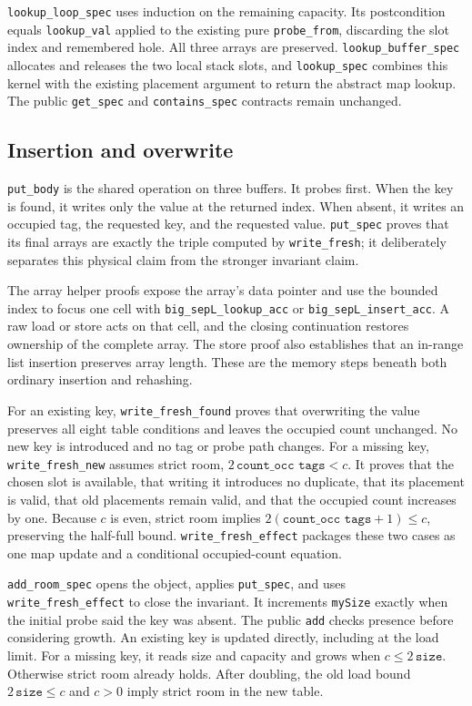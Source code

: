 \documentclass[11pt]{article}
\begin{document}
\texttt{lookup\_loop\_spec} uses induction on the remaining capacity. Its
postcondition equals \texttt{lookup\_val} applied to the existing pure
\texttt{probe\_from}, discarding the slot index and remembered hole. All
three arrays are preserved. \texttt{lookup\_buffer\_spec} allocates and
releases the two local stack slots, and \texttt{lookup\_spec} combines this
kernel with the existing placement argument to return the abstract map
lookup. The public \texttt{get\_spec} and \texttt{contains\_spec} contracts
remain unchanged.

\subsection{Insertion and overwrite}

\texttt{put\_body} is the shared operation on three buffers. It probes first.
When the key is found, it writes only the value at the returned index. When
absent, it writes an occupied tag, the requested key, and the requested value.
\texttt{put\_spec} proves that its final arrays are exactly the triple computed
by \texttt{write\_fresh}; it deliberately separates this physical claim from
the stronger invariant claim.

The array helper proofs expose the array's data pointer and use the bounded
index to focus one cell with \texttt{big\_sepL\_lookup\_acc} or
\texttt{big\_sepL\_insert\_acc}. A raw load or store acts on that cell, and the
closing continuation restores ownership of the complete array. The store proof
also establishes that an in-range list insertion preserves array length.
These are the memory steps beneath both ordinary insertion and rehashing.

For an existing key, \texttt{write\_fresh\_found} proves that overwriting the
value preserves all eight table conditions and leaves the occupied count
unchanged. No new key is introduced and no tag or probe path changes.
For a missing key, \texttt{write\_fresh\_new} assumes strict room,
$2\,\texttt{count\_occ tags}<c$. It proves that the chosen slot is available,
that writing it introduces no duplicate, that its placement is valid, that old
placements remain valid, and that the occupied count increases by one.
Because $c$ is even, strict room implies
$2(\texttt{count\_occ tags}+1)\leq c$, preserving the half-full bound.
\texttt{write\_fresh\_effect} packages these two cases as one map update and a
conditional occupied-count equation.

\texttt{add\_room\_spec} opens the object, applies \texttt{put\_spec}, and uses
\texttt{write\_fresh\_effect} to close the invariant. It increments
\texttt{mySize} exactly when the initial probe said the key was absent.
The public \texttt{add} checks presence before considering growth. An existing
key is updated directly, including at the load limit. For a missing key, it
reads size and capacity and grows when $c\leq 2\,\texttt{size}$.
Otherwise strict room already holds. After doubling, the old load bound
$2\,\texttt{size}\leq c$ and $c>0$ imply strict room in the new table.
\end{document}

